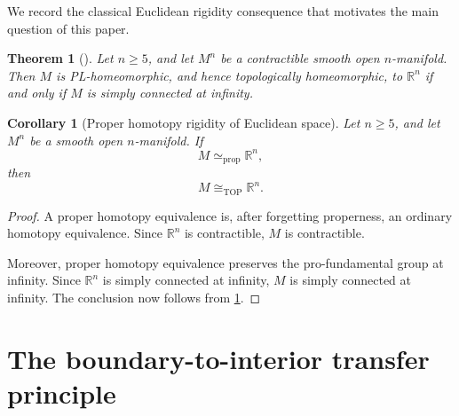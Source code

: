 \documentclass[10pt,reqno]{amsart}
\numberwithin{equation}{section}
\newtheorem{theorem}{Theorem}
\newtheorem{corollary}{Corollary}
\theoremstyle{definition}
\theoremstyle{remark}
\newtheorem{remark}{Remark}
\newcommand{\TOP}{\mathrm{TOP}}
\begin{document}
We record the classical Euclidean rigidity consequence that motivates
the main question of this paper.

\begin{theorem}[{\cite[Theorem~4]{StallingsEuclidean}}]
\label{thm:stallings-euclidean}
Let \(n\geq5\), and let \(M^n\) be a contractible smooth open
\(n\)-manifold.  Then \(M\) is PL-homeomorphic, and hence
topologically homeomorphic, to \(\mathbb R^n\) if and only if \(M\) is
simply connected at infinity.
\end{theorem}


\begin{corollary}[Proper homotopy rigidity of Euclidean space]
\label{cor:proper-rigidity-euclidean}
Let \(n\geq5\), and let \(M^n\) be a smooth open \(n\)-manifold.  If
\[
M\simeq_{\mathrm{prop}}\mathbb R^n,
\]
then
\[
M\cong_{\TOP}\mathbb R^n.
\]
\end{corollary}

\begin{proof}
A proper homotopy equivalence is, after forgetting properness, an
ordinary homotopy equivalence.  Since \(\mathbb R^n\) is contractible,
\(M\) is contractible.

Moreover, proper homotopy equivalence preserves the pro-fundamental
group at infinity.  Since \(\mathbb R^n\) is simply connected at
infinity, \(M\) is simply connected at infinity.  The conclusion now
follows from \cref{thm:stallings-euclidean}.
\end{proof}




\section{The boundary-to-interior transfer principle}
\end{document}
